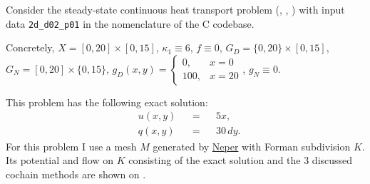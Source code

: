 \begin{example}
  Consider the steady-state continuous heat transport problem
  (,
   ,
   )
  with input data \verb|2d_d02_p01| in the nomenclature of the C codebase.

  Concretely,
    $X = [0, 20] \times [0, 15]$,
    $\kappa_1 \equiv 6$,
    $f \equiv 0$,
    $G_D = \{0, 20\} \times [0, 15]$,
    $G_N = [0, 20] \times \{0, 15\}$,
    $g_D(x, y) = \begin{cases} 0, & x = 0 \\ 100, & x = 20 \end{cases}$,
    $g_N \equiv 0$.

  This problem has the following exact solution:
  \begin{subequations}
    \begin{alignat}{3}
      & u(x, y) && = && 5 x, \\
      & q(x, y) && = && 30 \, d y.
    \end{alignat}
  \end{subequations}
  For this problem I use a mesh $M$ generated by
  \href{https://neper.info/}{Neper} with Forman subdivision $K$.
  Its potential and flow on $K$ consisting of the exact solution and the $3$
  discussed cochain methods are shown on
  .
\end{example}
